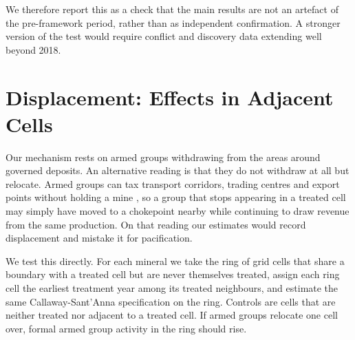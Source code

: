 \documentclass[11pt]{article}
\begin{document}
We therefore report this as a check that the main results are not an artefact of the pre-framework period, rather than as independent confirmation. A stronger version of the test would require conflict and discovery data extending well beyond 2018.




\section{Displacement: Effects in Adjacent Cells}
\label{sec:spillover}

Our mechanism rests on armed groups withdrawing from the areas around governed deposits. An alternative reading is that they do not withdraw at all but relocate. Armed groups can tax transport corridors, trading centres and export points without holding a mine \citep{sanchez2020mining}, so a group that stops appearing in a treated cell may simply have moved to a chokepoint nearby while continuing to draw revenue from the same production. On that reading our estimates would record displacement and mistake it for pacification.

We test this directly. For each mineral we take the ring of grid cells that share a boundary with a treated cell but are never themselves treated, assign each ring cell the earliest treatment year among its treated neighbours, and estimate the same Callaway-Sant'Anna specification on the ring. Controls are cells that are neither treated nor adjacent to a treated cell. If armed groups relocate one cell over, formal armed group activity in the ring should rise.
\end{document}
